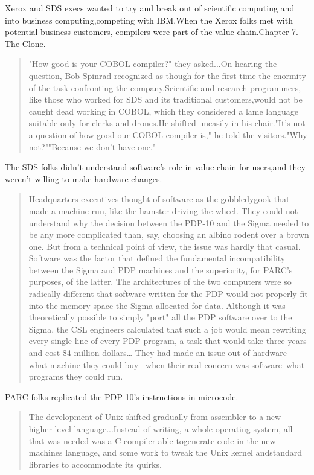 Xerox and SDS execs wanted to try and break out of scientific computing and
into business computing,competing with IBM.When the Xerox folks met with
potential business customers, compilers were part of the value chain.Chapter 7.
The Clone.
\begin{quotation}
	"How good is your COBOL compiler?" they asked...On hearing the question, Bob
	Spinrad recognized as though for the first time the enormity of the task
	confronting the company.Scientific and research programmers, like those who
	worked for SDS and its traditional customers,would not be caught dead working
	in COBOL, which they considered a lame language suitable only for clerks and
	drones.He shifted uneasily in his chair."It's not a question of how good our
	COBOL compiler is," he told the visitors."Why not?""Because we don't have
	one."
\end{quotation}
The SDS folks didn't understand software's role in value chain for users,and
they weren't willing to make hardware changes.
\begin{quotation}
	Headquarters executives thought of software as the gobbledygook that made a
	machine run,    like the hamster driving the wheel. They could not understand
	why the decision between the PDP-10    and the Sigma needed to be any more
	complicated than, say, choosing an albino rodent over a brown one.    But from
	a technical point of view, the issue was hardly that casual.    Software was
	the factor that defined the fundamental incompatibility between the Sigma and
	PDP machines    and the superiority, for PARC's purposes, of the latter.    The
	architectures of the two computers were so radically different that software
	written for the PDP would not    properly fit into the memory space the Sigma
	allocated for data.    Although it was theoretically possible to simply "port"
	all the PDP software over to the Sigma, the CSL    engineers calculated that
	such a job would mean rewriting every single line of every PDP program,    a
	task that would take three years and cost \$4 million dollars\dots
	They had made an issue out of hardware--what machine they could buy
	--when their real concern was software--what programs they could
	run.
\end{quotation}
PARC folks replicated the PDP-10's instructions in
microcode.
\begin{quotation}
	The development of Unix shifted gradually from assembler to a new higher-level
	language...Instead of writing, a whole operating system, all that was needed
	was a C compiler able togenerate code in the new machines language, and some
	work to tweak the Unix kernel andstandard libraries to accommodate its
	quirks.
\end{quotation}
